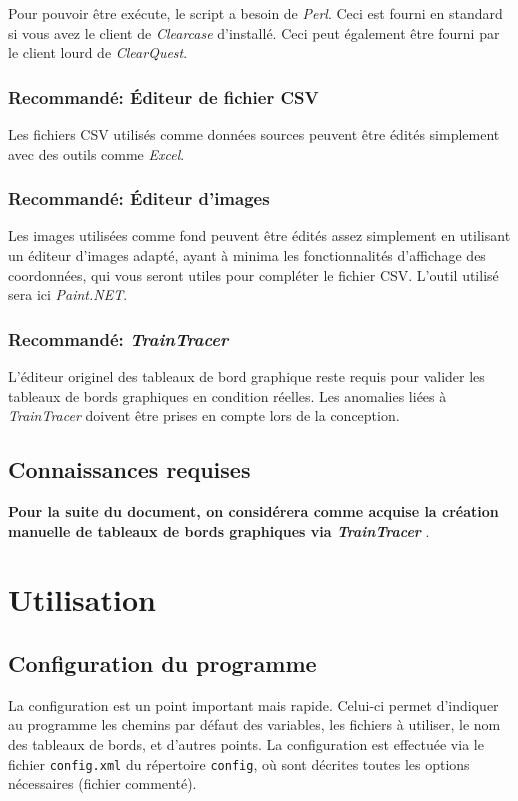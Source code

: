 \documentclass{AlstomLibrary}
\newcommand{\progname}[1]{\textit{#1}}
\newcommand{\TT}{{\progname{TrainTracer}} }
\begin{document}
Pour pouvoir être exécute, le script a besoin de \progname{Perl}. Ceci est fourni en standard si vous avez le client de \progname{Clearcase} d'installé. Ceci peut également être fourni par le client lourd de \progname{ClearQuest}.

\subsection*{Recommandé: Éditeur de fichier CSV}

Les fichiers CSV utilisés comme données sources peuvent être édités simplement avec des outils comme \progname{Excel}.

\subsection*{Recommandé: Éditeur d'images}

Les images utilisées comme fond peuvent être édités assez simplement en utilisant un éditeur d'images adapté, ayant à minima les fonctionnalités d'affichage des coordonnées, qui vous seront utiles pour compléter le fichier CSV. L'outil utilisé sera ici \progname{Paint.NET}. 

\subsection*{Recommandé: \TT}

L'éditeur originel des tableaux de bord graphique reste requis pour valider les tableaux de bords graphiques en condition réelles. Les anomalies liées à \TT doivent être prises en compte lors de la conception.

\section{Connaissances requises}

\textbf{Pour la suite du document, on considérera comme acquise la création manuelle de tableaux de bords graphiques via \TT}.

\chapter{Utilisation}

\section{Configuration du programme}

La configuration est un point important mais rapide. Celui-ci permet d'indiquer au programme les chemins par défaut des variables, les fichiers à utiliser, le nom des tableaux de bords, et d'autres points. La configuration est effectuée via le fichier \texttt{config.xml} du répertoire \texttt{config}, où sont décrites toutes les options nécessaires (fichier commenté).
\end{document}
